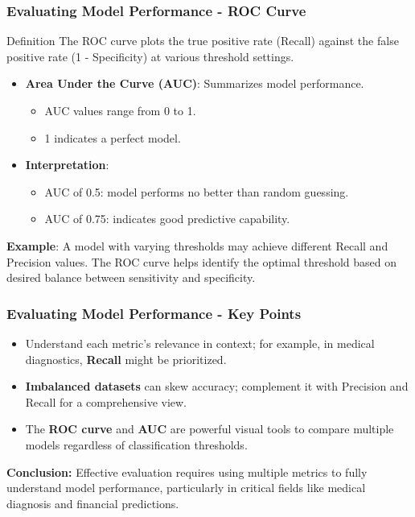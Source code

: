 \documentclass[aspectratio=169]{beamer}
\begin{document}
\begin{frame}[fragile]
    \frametitle{Evaluating Model Performance - ROC Curve}
    \begin{block}{Definition}
        The ROC curve plots the true positive rate (Recall) against the false positive rate (1 - Specificity) at various threshold settings.
    \end{block}
    \begin{itemize}
        \item \textbf{Area Under the Curve (AUC)}: Summarizes model performance.
        \begin{itemize}
            \item AUC values range from 0 to 1.
            \item 1 indicates a perfect model.
        \end{itemize}
        \item \textbf{Interpretation}:
        \begin{itemize}
            \item AUC of 0.5: model performs no better than random guessing.
            \item AUC of 0.75: indicates good predictive capability.
        \end{itemize}
    \end{itemize}
    \textbf{Example}: A model with varying thresholds may achieve different Recall and Precision values. The ROC curve helps identify the optimal threshold based on desired balance between sensitivity and specificity.
\end{frame}

\begin{frame}[fragile]
    \frametitle{Evaluating Model Performance - Key Points}
    \begin{itemize}
        \item Understand each metric’s relevance in context; for example, in medical diagnostics, \textbf{Recall} might be prioritized.
        \item \textbf{Imbalanced datasets} can skew accuracy; complement it with Precision and Recall for a comprehensive view.
        \item The \textbf{ROC curve} and \textbf{AUC} are powerful visual tools to compare multiple models regardless of classification thresholds.
    \end{itemize}
    \textbf{Conclusion:} Effective evaluation requires using multiple metrics to fully understand model performance, particularly in critical fields like medical diagnosis and financial predictions.
\end{frame}
\end{document}
